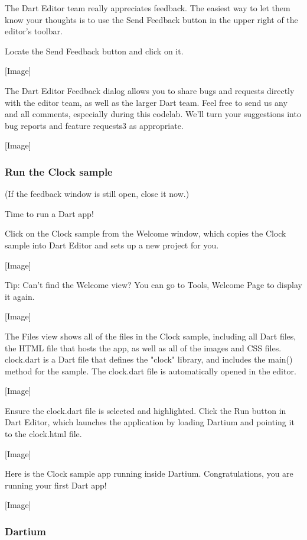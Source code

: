 The Dart Editor team really appreciates feedback. The easiest way to let them know your thoughts is to use the Send Feedback button in the upper right of the editor’s toolbar.

Locate the Send Feedback button and click on it.

[Image]

The Dart Editor Feedback dialog allows you to share bugs and requests directly with the editor team, as well as the larger Dart team. Feel free to send us any and all comments, especially during this codelab. We’ll turn your suggestions into bug reports and feature requests3 as appropriate.

[Image]

\subsubsection{Run the Clock sample}

(If the feedback window is still open, close it now.)

Time to run a Dart app!

Click on the Clock sample from the Welcome window, which copies the Clock sample into Dart Editor and sets up a new project for you.

[Image]

Tip: Can’t find the Welcome view? You can go to Tools, Welcome Page to display it again.

[Image]

The Files view shows all of the files in the Clock sample, including all Dart files, the HTML file that hosts the app, as well as all of the images and CSS files. clock.dart is a Dart file that defines the "clock" library, and includes the main() method for the sample. The clock.dart file is automatically opened in the editor.

[Image]

Ensure the clock.dart file is selected and highlighted. Click the Run button in Dart Editor, which launches the application by loading Dartium and pointing it to the clock.html file.

[Image]

Here is the Clock sample app running inside Dartium. Congratulations, you are running your first Dart app!

[Image]

\subsubsection{Dartium}

